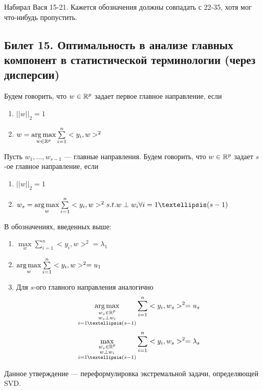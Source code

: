 
{\color{blue} Набирал Вася 15-21. Кажется обозначения должны совпадать с 22-35, хотя мог что-нибудь пропустить.}
\subsection{Билет 15. Оптимальность в анализе главных компонент в статистической терминологии (через дисперсии)}

\begin{dfn} Будем говорить, что $w \in \mathbb{R}^p$ задает первое главное направление, если 
\begin{enumerate}
\item $||w||_2 = 1$
\item $w = \operatorname*{arg\,max}\limits_{w \in \mathbb{R}^p}\sum \limits_{i=1}^n <y_i, w>^2 $
\end{enumerate}
\end{dfn}



\begin{dfn} Пусть $w_1, …, w_{s-1}$ — главные направления. Будем говорить, что $w \in \mathbb{R}^p$ задает $s$-ое главное направление, если 
\begin{enumerate}
\item $||w||_2 = 1$
\item $w_s = \argmax\limits_{w}\sum \limits_{i=1}^n <y_i, w>^2 s.t. w \perp w_i \forall i=1…(s-1) $
\end{enumerate}
\end{dfn}


\begin{thm}
В обозначениях, введенных выше:

\begin{enumerate}
\item $\max\limits_{w}\sum \limits_{i=1}^n <y_i, w>^2  = \lambda_1$
\item $ \operatorname*{arg\,max}\limits_{w}\sum \limits_{i=1}^n <y_i, w>^2 = u_1$
\item Для $s$-ого главного направления аналогично 
$$ \argmax\limits_{\substack{w_s \in \R^p \\ w_s \perp w_i\\ i=1…(s-1)}}\sum \limits_{i=1}^n <y_i, w_s>^2 = u_s$$
$$ \max\limits_{\substack{w_s \in \R^p\\ w \perp w_i\\ i=1…(s-1)}}\sum \limits_{i=1}^n <y_i, w_s>^2 = \lambda_s$$
\end{enumerate}
\end{thm}

Данное утверждение — переформулировка экстремальной задачи, определяющей SVD.

